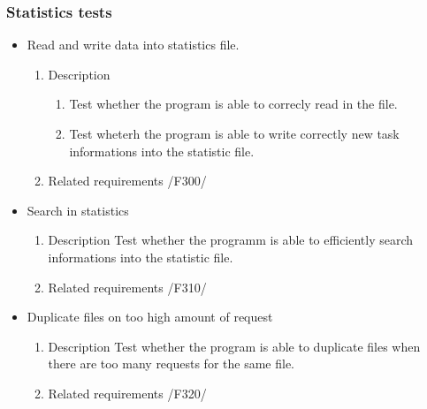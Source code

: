 {		\subsubsection{Statistics tests}
		\begin{itemize}
		
		
		
				\item Read and write data into statistics file.
				\begin{enumerate}
					\item Description\newline
					\begin{enumerate}
					
					\item 
Test whether the program is able to correcly read in the file.
					\item
Test wheterh the program is able to write correctly new task informations into the statistic file.
					\end{enumerate}
					\item Related requirements\newline
					/F300/
					
				\end{enumerate}
				
				
				\item Search in statistics
				\begin{enumerate}
					\item Description\newline
Test whether the programm is able to efficiently search informations into the statistic file. 
					\item Related requirements\newline
					/F310/
				\end{enumerate}
				
				
				\item Duplicate files on too high amount of request
				\begin{enumerate}
					\item Description\newline
Test whether the program is able to duplicate files when there are too many requests for the same file.
					\item Related requirements\newline
					/F320/
				\end{enumerate}
				
				
				

\end{itemize}}
